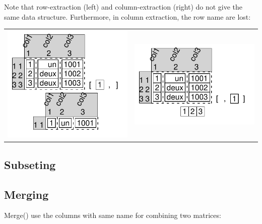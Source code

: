 \documentclass[pdflatex]{article}
\begin{document}
Note that row-extraction (left) and column-extraction (right) do not give the
same data structure. Furthermore, in column extraction, the row name are lost:

\begin{tabular}{cc}
\includegraphics{dataframe_extracting_row.pdf} & \includegraphics{dataframe_extracting_column.pdf}
\end{tabular}

\subsection{Subseting}

\subsection{Merging}

Merge() use the columns with same name for combining two matrices:
\end{document}
